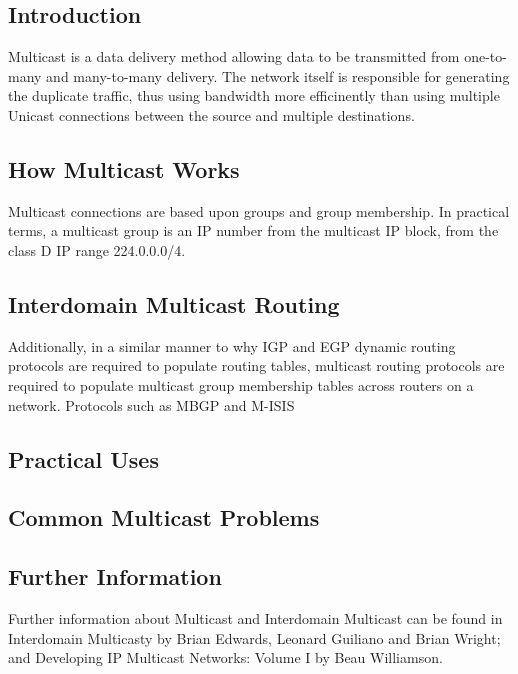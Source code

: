 
\subsection{Introduction}

Multicast is a data delivery method allowing data to be transmitted from
one-to-many and many-to-many delivery. The network itself is responsible
for generating the duplicate traffic, thus using bandwidth more
efficinently than using multiple Unicast connections between the source
and multiple destinations.

\subsection{How Multicast Works}

Multicast connections are based upon groups and group membership. In
practical terms, a multicast group is an IP number from the multicast IP
block, from the class D IP range 224.0.0.0/4.





\subsection{Interdomain Multicast Routing}

Additionally, in a similar manner to why IGP and EGP dynamic routing
protocols are required to populate routing tables, multicast routing
protocols are required to populate multicast group membership tables 
across routers on a network. Protocols such as MBGP and M-ISIS 

\subsection{Practical Uses}


\subsection{Common Multicast Problems}


\subsection{Further Information}

Further information about Multicast and Interdomain Multicast can be
found in Interdomain Multicasty by Brian Edwards, Leonard Guiliano and
Brian Wright; and Developing IP Multicast Networks: Volume I by Beau
Williamson.
